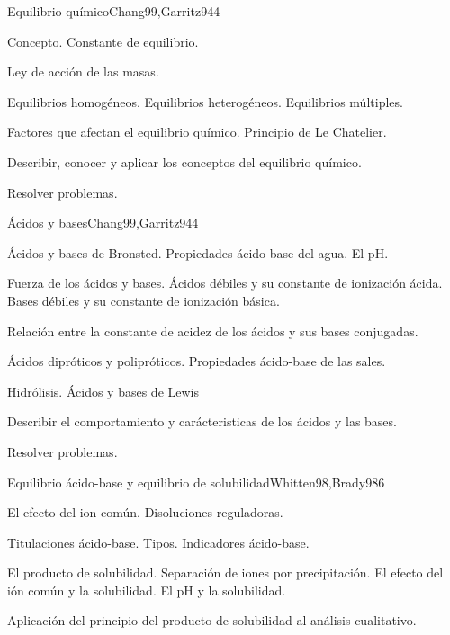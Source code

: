 \begin{syllabus}
\begin{unit}{Equilibrio químico}{Chang99,Garritz94}{4}
\begin{topics}
      \item Concepto. Constante de equilibrio.
      \item Ley de acción de las masas.
      \item Equilibrios homogéneos. Equilibrios heterogéneos. Equilibrios múltiples.
      \item Factores que afectan el equilibrio químico. Principio de Le Chatelier.
    \end{topics}
   \begin{learningoutcomes}
      \item Describir, conocer y aplicar los conceptos del equilibrio químico.
      \item Resolver problemas.
   \end{learningoutcomes}
\end{unit}

\begin{unit}{Ácidos y bases}{Chang99,Garritz94}{4}
\begin{topics}
	\item Ácidos y bases de Bronsted. Propiedades ácido-base del agua. El pH.
	\item Fuerza de los ácidos y bases. Ácidos débiles y su constante de ionización ácida. Bases débiles y su constante de ionización básica. 
	\item Relación entre la constante de acidez de los ácidos y sus bases conjugadas.
	\item Ácidos dipróticos y polipróticos. Propiedades ácido-base de las sales.
	\item Hidrólisis.  Ácidos y bases de Lewis
\end{topics}

\begin{learningoutcomes}
	\item Describir el comportamiento y carácteristicas de los ácidos y las bases.
	\item Resolver problemas.
\end{learningoutcomes}
\end{unit}

\begin{unit}{Equilibrio ácido-base y equilibrio de solubilidad}{Whitten98,Brady98}{6}
\begin{topics}
	\item El efecto del ion común. Disoluciones reguladoras.
	\item Titulaciones ácido-base. Tipos.  Indicadores ácido-base.
	\item El producto de solubilidad. Separación de iones por precipitación. El efecto del ión común y la solubilidad. El pH y la solubilidad.
	\item Aplicación del principio del producto de solubilidad al análisis cualitativo.
\end{topics}


\end{unit}
\end{syllabus}
